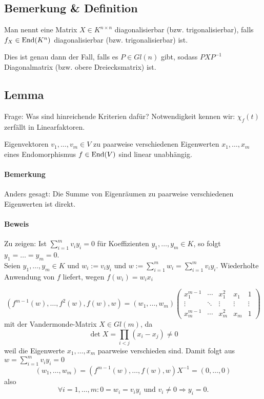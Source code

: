 \subsection{Bemerkung \& Definition}
\begin{Definition}
	Man nennt eine Matrix $ X\in K^{n\times n} $ diagonalisierbar (bzw. trigonalisierbar), falls $ f_X\in \operatorname{End}(K^n) $ diagonalisierbar (bzw. trigonalisierbar) ist.
\end{Definition}	

	Dies ist genau dann der Fall, falls es $ P\in Gl(n) $ gibt, sodass $ PXP^{-1} $ Diagonalmatrix (bzw. obere Dreiecksmatrix) ist.


\subsection{Lemma}
	Frage: Was sind hinreichende Kriterien dafür? Notwendigkeit kennen wir: $ \chi_f(t) $ zerfällt in Linearfaktoren.
	
	\begin{Lemma}
		Eigenvektoren $ v_1,\dots,v_m\in V $ zu paarweise verschiedenen Eigenwerten $ x_1,\dots,x_m $ eines Endomorphismus $ f\in\operatorname{End}(V) $ sind linear unabhängig.
	\end{Lemma}
\paragraph{Bemerkung}
	Anders gesagt: Die Summe von Eigenräumen zu paarweise verschiedenen Eigenwerten ist direkt.
\paragraph{Beweis}
	Zu zeigen: Ist $ \sum_{i=1}^m v_iy_i = 0 $ für Koeffizienten $ y_1,\dots,y_m\in K $, so folgt $ y_1 = \dots = y_m = 0 $.\\	
	Seien $ y_1,\dots,y_m \in K $ und $ w_i := v_iy_i $ und $ w:= \sum_{i=1}^{m}w_i = \sum_{i=1}^{m}v_iy_i$.
	Wiederholte Anwendung von $ f $ liefert, wegen $ f(w_i) = w_ix_i $
	
		\[ (f^{m-1}(w),\dots,f^2(w),f(w),w) = (w_1,\dots,w_m)
		\begin{pmatrix}
		 x_1^{m-1}&\cdots&x_1^2&x_1&1 \\
		 \vdots&\ddots&\vdots&\vdots&\vdots\\
		 x_m^{m-1}&\cdots&x_m^2&x_m & 1
		\end{pmatrix} \]
	mit der Vandermonde-Matrix $ X\in Gl(m) $, da
		\[ \det X = \prod_{i<j} (x_i - x_j)\neq 0 \]
	weil die Eigenwerte $ x_1,\dots,x_m $ paarweise verschieden sind.
	Damit folgt aus $ w=\sum_{i=1}^{m}v_iy_i = 0 $
		\[ (w_1,\dots,w_m)=(f^{m-1}(w),\dots,f(w),w)X^{-1} = (0,\dots,0) \]
	also
		\[ \forall i=1,\dots,m: 0 = w_i = v_iy_i \text{ und }v_i \neq 0 \Rightarrow y_i = 0.  \]
